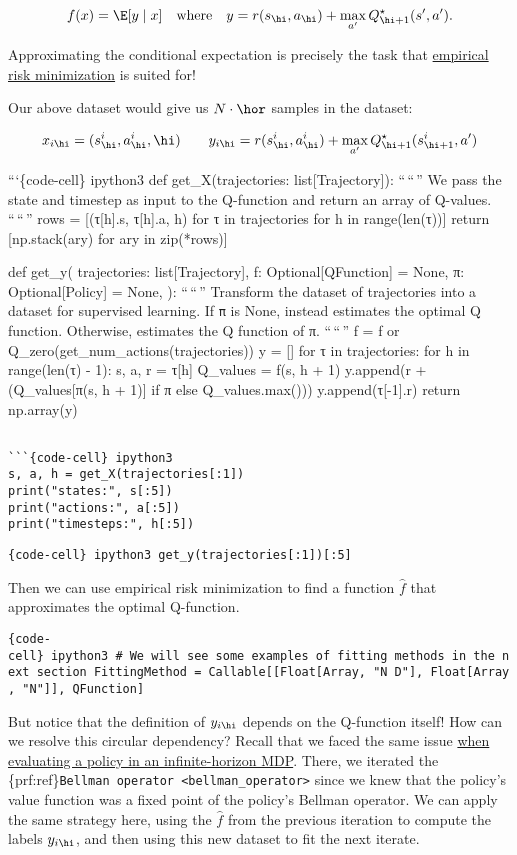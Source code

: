 \[
f(x) = \E [y \mid x] \quad \text{where} \quad y = r(s_\hi, a_\hi) + \max_{a'} Q^\star_{\hi + 1}(s', a').
\]

Approximating the conditional expectation is precisely the task that
\href{erm}{empirical risk minimization} is suited for!

Our above dataset would give us \(N \cdot \hor\) samples in the dataset:

\[
x_{i \hi} = (s_\hi^i, a_\hi^i, \hi) \qquad y_{i \hi} = r(s_\hi^i, a_\hi^i) + \max_{a'} Q^\star_{\hi + 1}(s_{\hi + 1}^i, a')
\]

```\{code-cell\} ipython3 def get\_X(trajectories:
list{[}Trajectory{]}): ``\,``\,'' We pass the state and timestep as
input to the Q-function and return an array of Q-values. ``\,``\,'' rows
= {[}(τ{[}h{]}.s, τ{[}h{]}.a, h) for τ in trajectories for h in
range(len(τ)){]} return {[}np.stack(ary) for ary in zip(*rows){]}

def get\_y( trajectories: list{[}Trajectory{]}, f:
Optional{[}QFunction{]} = None, π: Optional{[}Policy{]} = None, ):
``\,``\,'' Transform the dataset of trajectories into a dataset for
supervised learning. If \texttt{π} is None, instead estimates the
optimal Q function. Otherwise, estimates the Q function of π. ``\,``\,''
f = f or Q\_zero(get\_num\_actions(trajectories)) y = {[}{]} for τ in
trajectories: for h in range(len(τ) - 1): s, a, r = τ{[}h{]} Q\_values =
f(s, h + 1) y.append(r + (Q\_values{[}π(s, h + 1){]} if π else
Q\_values.max())) y.append(τ{[}-1{]}.r) return np.array(y)

\begin{verbatim}

```{code-cell} ipython3
s, a, h = get_X(trajectories[:1])
print("states:", s[:5])
print("actions:", a[:5])
print("timesteps:", h[:5])
\end{verbatim}

\texttt{\{code-cell\}\ ipython3\ get\_y(trajectories{[}:1{]}){[}:5{]}}

Then we can use empirical risk minimization to find a function
\(\hat f\) that approximates the optimal Q-function.

\texttt{\{code-cell\}\ ipython3\ \#\ We\ will\ see\ some\ examples\ of\ fitting\ methods\ in\ the\ next\ section\ FittingMethod\ =\ Callable{[}{[}Float{[}Array,\ "N\ D"{]},\ Float{[}Array,\ "N"{]}{]},\ QFunction{]}}

But notice that the definition of \(y_{i \hi}\) depends on the
Q-function itself! How can we resolve this circular dependency? Recall
that we faced the same issue \href{iterative_pe}{when evaluating a
policy in an infinite-horizon MDP}. There, we iterated the
\{prf:ref\}\texttt{Bellman\ operator\ \textless{}bellman\_operator\textgreater{}}
since we knew that the policy's value function was a fixed point of the
policy's Bellman operator. We can apply the same strategy here, using
the \(\hat f\) from the previous iteration to compute the labels
\(y_{i \hi}\), and then using this new dataset to fit the next iterate.

